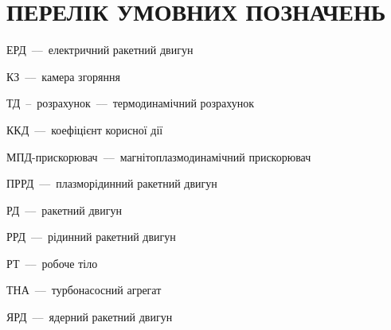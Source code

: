 \chapter*{ПЕРЕЛІК УМОВНИХ ПОЗНАЧЕНЬ}

{%

ЕРД~–--~електричний ракетний двигун

КЗ~–--~камера згоряння

ТД~--~розрахунок~–--~термодинамічний розрахунок

ККД~–--~коефіцієнт корисної дії

МПД-прискорювач~–--~магнітоплазмодинамічний прискорювач

ПРРД~–--~плазморідинний ракетний двигун

РД~–--~ракетний двигун

РРД~–--~рідинний ракетний двигун

РТ~–--~робоче тіло

ТНА~–--~турбонасосний агрегат

ЯРД~–--~ядерний ракетний двигун































}














